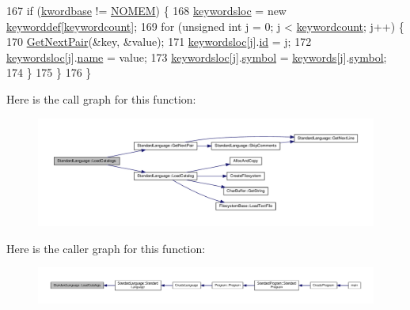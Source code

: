 \begin{DoxyCode}
167     \textcolor{keywordflow}{if} (\hyperlink{classStandardLanguage_a02ebeba276a3f355b73533eb8a664673}{kwordbase} != \hyperlink{platform_8h_a46ff2bfbf0d44b8466a2251d5bd5e6f8}{NOMEM}) \{
168         \hyperlink{classLanguage_a14560ed53cf2860b61199d2882c52f67}{keywordsloc} = \textcolor{keyword}{new} \hyperlink{structkeyworddef}{keyworddef}[\hyperlink{classLanguage_ab392fc18ba79a2a47bdde99eec400aa1}{keywordcount}];
169         \textcolor{keywordflow}{for} (\textcolor{keywordtype}{unsigned} \textcolor{keywordtype}{int} j = 0; j < \hyperlink{classLanguage_ab392fc18ba79a2a47bdde99eec400aa1}{keywordcount}; j++) \{
170             \hyperlink{classStandardLanguage_ab1945e2e3503ce12eac28c0d08234cfb}{GetNextPair}(&key, &value);
171             \hyperlink{classLanguage_a14560ed53cf2860b61199d2882c52f67}{keywordsloc}[j].\hyperlink{structkeyworddef_a7f5bc29bae784c5b8af94f858d500be5}{id} = j;
172             \hyperlink{classLanguage_a14560ed53cf2860b61199d2882c52f67}{keywordsloc}[j].\hyperlink{structkeyworddef_a03b3d7dd316565c6fac8786186ec66c2}{name} = value;
173             \hyperlink{classLanguage_a14560ed53cf2860b61199d2882c52f67}{keywordsloc}[j].\hyperlink{structkeyworddef_aec6598e221bbce9e131b30989f7e2cce}{symbol} = \hyperlink{kword_8h_ae24629a120e041e6b687315832fca587}{keywords}[j].\hyperlink{structkeyworddef_aec6598e221bbce9e131b30989f7e2cce}{symbol};
174         \}
175     \}
176 \}
\end{DoxyCode}


Here is the call graph for this function\+:\nopagebreak
\begin{figure}[H]
\begin{center}
\leavevmode
\includegraphics[width=350pt]{classStandardLanguage_afd0037d341b94b08497842470007e59b_cgraph}
\end{center}
\end{figure}




Here is the caller graph for this function\+:\nopagebreak
\begin{figure}[H]
\begin{center}
\leavevmode
\includegraphics[width=350pt]{classStandardLanguage_afd0037d341b94b08497842470007e59b_icgraph}
\end{center}
\end{figure}


